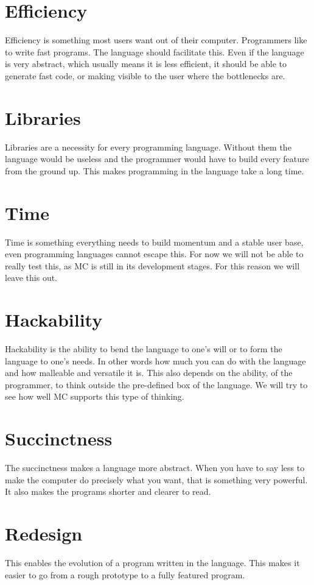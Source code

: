 \section{Efficiency}
Efficiency is something most users want out of their computer.
Programmers like to write fast programs.
The language should facilitate this.
Even if the language is very abstract, which usually means it is less efficient\cite{graham2004hackers}, it should be able to generate fast code, or making visible to the user where the bottlenecks are.

\section{Libraries}
Libraries are a necessity for every programming language.
Without them the language would be useless and the programmer would have to build every feature from the ground up.
This makes programming in the language take a long time.

\section{Time}
Time is something everything needs to build momentum and a stable user base, even programming languages cannot escape this.
For now we will not be able to really test this, as MC is still in its development stages.
For this reason we will leave this out.

\section{Hackability}
Hackability is the ability to bend the language to one's will or to form the language to one's needs.
In other words how much you can do with the language and how malleable and versatile it is.
This also depends on the ability, of the programmer, to think outside the pre-defined box of the language.
We will try to see how well MC supports this type of thinking.

\section{Succinctness}
The succinctness makes a language more abstract.
When you have to say less to make the computer do precisely what you want, that is something very powerful.
It also makes the programs shorter and clearer to read.

\section{Redesign}
This enables the evolution of a program written in the language.
This makes it easier to go from a rough prototype to a fully featured program.

